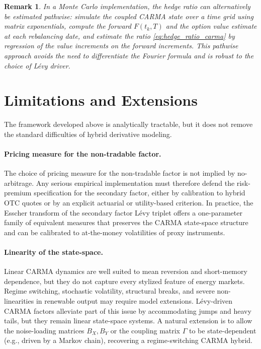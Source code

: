 \documentclass[10pt,a4paper,reqno]{amsart}
\newtheorem{remark}[theorem]{Remark}
\newcommand{\1}{\mathbbm{1}}
\begin{document}
\begin{remark}
In a Monte Carlo implementation, the hedge ratio can alternatively be
estimated pathwise: simulate the coupled CARMA state over a time grid using
matrix exponentials, compute the forward \(F(t_k,T)\) and the option value
estimate at each rebalancing date, and estimate the ratio
\eqref{eq:hedge_ratio_carma} by regression of the value increments on the
forward increments. This pathwise approach avoids the need to differentiate
the Fourier formula and is robust to the choice of Lévy driver.
\end{remark}

\section{Limitations and Extensions}\label{sec:limitations}

The framework developed above is analytically tractable, but it does not remove
the standard difficulties of hybrid derivative modeling.

\paragraph{Pricing measure for the non-tradable factor.}
The choice of pricing measure for the non-tradable factor is not implied
by no-arbitrage. Any serious empirical implementation must therefore defend the
risk-premium specification for the secondary factor, either by calibration to
hybrid OTC quotes or by an explicit actuarial or utility-based criterion.
In practice, the Esscher transform of the secondary factor Lévy triplet offers a
one-parameter family of equivalent measures that preserves the CARMA state-space
structure and can be calibrated to at-the-money volatilities of proxy instruments.

\paragraph{Linearity of the state-space.}
Linear CARMA dynamics are well suited to mean reversion and short-memory
dependence, but they do not capture every stylized feature of energy markets.
Regime switching, stochastic volatility, structural breaks, and severe
non-linearities in renewable output may require model extensions. Lévy-driven
CARMA factors alleviate part of this issue by accommodating jumps and heavy
tails, but they remain linear state-space systems. A natural extension is to
allow the noise-loading matrices \(B_X, B_Y\) or the coupling matrix
\(\Gamma\) to be state-dependent (e.g., driven by a Markov chain), recovering
a regime-switching CARMA hybrid.
\end{document}
